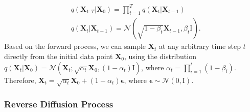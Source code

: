 \documentclass[11pt]{article}
\begin{document}
\begin{align}\label{eq: forward diffusion}
	&q(\bm{X}_{1:T}|\bm{X}_0)=\prod_{t=1}^{T}q(\bm{X}_t|\bm{X}_{t-1})\\
	&q(\bm{X}_t|\bm{X}_{t-1})=\mathcal{N}(\sqrt{1-\beta_t}\bm{X}_{t-1}, \beta_t\bm{\mathrm{I}}).
\end{align}
Based on the forward process, we can sample $\bm{X}_t$ at any arbitrary time step $t$ directly from the initial data point $\bm{X}_0$, using the distribution $q(\bm{X}_t|\bm{X}_0)=\mathcal{N}(\bm{X}_t;\sqrt{\alpha_t}\bm{X}_0, (1-\alpha_t)\bm{\mathrm{I}})$, where $\alpha_t=\prod_{i=1}^t (1-\beta_i)$.  Therefore, $\bm{X}_t=\sqrt{\alpha_t}\bm{X}_0+(1-\alpha_t)\bm{\epsilon}$, where $\bm{\epsilon}\sim \mathcal{N}(0, \bm{\mathrm{I}})$. 


\subsubsection*{Reverse Diffusion Process}
\end{document}
